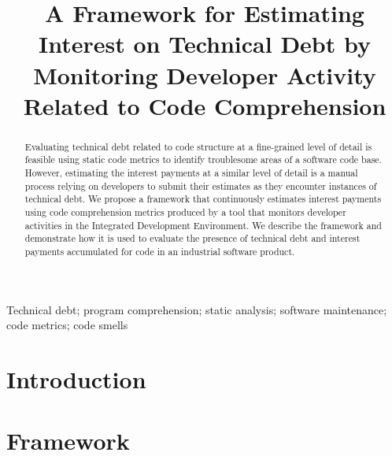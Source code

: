 \documentclass[conference]{IEEEtran}
\begin{document}
\title{A Framework for Estimating Interest on Technical Debt by Monitoring Developer Activity Related to Code Comprehension}

\author{
\and
{}
}

\maketitle

\begin{abstract}
Evaluating technical debt related to code structure at a fine-grained level of detail is feasible using static code metrics to identify troublesome areas of a software code base.  However, estimating the interest payments at a similar level of detail is a manual process relying on developers to submit their estimates as they encounter instances of technical debt.  We propose a framework that continuously estimates interest payments using code comprehension metrics produced by a tool that monitors developer activities in the Integrated Development Environment.  We describe the framework and demonstrate how it is used to evaluate the presence of technical debt and interest payments accumulated for code in an industrial software product.
\end{abstract}

\begin{IEEEkeywords}
Technical debt; program comprehension; static analysis; software maintenance; code metrics; code smells
\end{IEEEkeywords}

\section{Introduction}


\section{Framework}
\label{sec:DataFramework}


%
\end{document}
